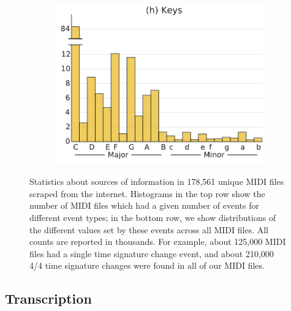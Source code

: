 \documentclass{article}
\begin{document}
\begin{figure}
\begin{subfigure}{.23\textwidth}
    \end{subfigure}
    \begin{subfigure}{.23\textwidth}
        \includegraphics[width=\textwidth]{keys.pdf}
    \end{subfigure}
    \caption{Statistics about sources of information in 178,561 unique MIDI files scraped from the internet.
    Histograms in the top row show the number of MIDI files which had a given number of events for different event types; in the bottom row, we show distributions of the different values set by these events across all MIDI files.
    All counts are reported in thousands.
    For example, about 125,000 MIDI files had a single time signature change event, and about 210,000 4/4 time signature changes were found in all of our MIDI files.}
    \label{fig:statistics}
\end{figure}

\subsection{Transcription}
\end{document}
